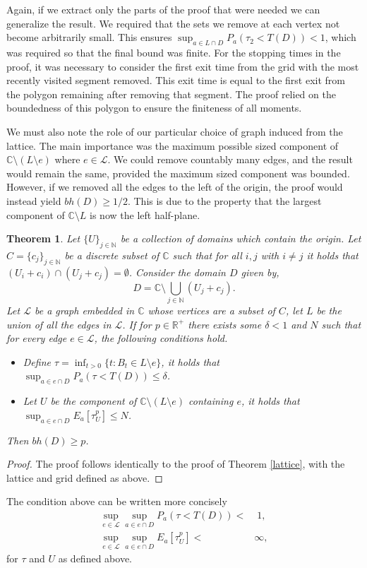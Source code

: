 \documentclass[a4paper, oneside, 12pt]{amsart}
\newcommand{\mc}{\mathcal}
\newcommand{\CC}{\mathbb{C}}
\newcommand{\NN}{\mathbb{N}}
\newcommand{\RR}{\mathbb{R}}
\newtheorem{theorem}{Theorem}[section]
\begin{document}
Again, if we extract only the parts of the proof that were needed we can generalize the result.
We required that the sets we remove at each vertex not become arbitrarily small. 
This ensures $\sup_{a\in L\cap D}P_a(\tau_2 < T(D)) < 1$, which was required so that the final bound was finite. 
For the stopping times in the proof, it was necessary to consider the first exit time from the 
grid with the most recently visited segment removed. 
This exit time is equal to the first exit from the polygon remaining after removing that segment. 
The proof relied on the boundedness of this polygon to ensure the finiteness of all moments. 

We must also note the role of our particular choice of graph induced from the lattice. The main importance was the maximum possible sized component 
of $\CC\setminus (L\setminus e)$ where $e\in\mc{L}$. We could remove countably many edges, and the result would remain the same, provided the maximum sized component was bounded. However, if we removed
all the edges to the left of the origin, the proof would instead yield $bh(D) \geq 1/2$. This is due to the property that the largest component of $\CC\setminus L$ is now the left half-plane.
\begin{theorem}
Let $\{U\}_{j\in \NN}$ be a collection of domains which contain the origin. Let $C =\{c_j\}_{j\in \NN}$ be a discrete subset of $\CC$ such that for all $i, j$ 
with $i\neq j$ it holds that $(U_i + c_i)\cap (U_j + c_j) = \emptyset$. Consider the domain $D$ given by,
$$
    D = \CC \setminus \bigcup_{j\in\NN} (U_j + c_j).
$$
Let $\mc{L}$ be a graph embedded in $\CC$ whose vertices are a subset of $C$, let $L$ be the union of all the edges in $\mc{L}$.
If for $p\in\RR^+$ there exists some $\delta < 1$ and $N$ such that for every edge $e\in\mc{L}$, the following conditions hold.
\begin{itemize}
    \item Define $\tau = \inf_{t>0}\{t: B_t \in L \setminus e\}$, it holds that $\sup_{a\in e\cap D} P_a(\tau < T(D)) \leq \delta$.
    \\
\item Let $U$ be the component of $\CC\setminus (L\setminus e)$   
containing $e$, it holds that $\sup_{a\in e\cap D} E_a[\tau_U^p] \leq N$.
\end{itemize}
Then $bh(D) \geq p$.
\end{theorem}

\begin{proof}
    The proof follows identically to the proof of Theorem \ref{lattice}, with the lattice and grid defined as above.
\end{proof}
The condition above can be written more concisely 
\begin{align*}
    \sup_{e\in\mc{L}}\sup_{a\in e\cap D} P_a(\tau<T(D)) <&\; 1,\\
    \sup_{e\in\mc{L}}\sup_{a\in e\cap D} E_a[\tau_U^p] <\;& \infty,
\end{align*}
for $\tau$ and $U$ as defined above.\\
\end{document}
